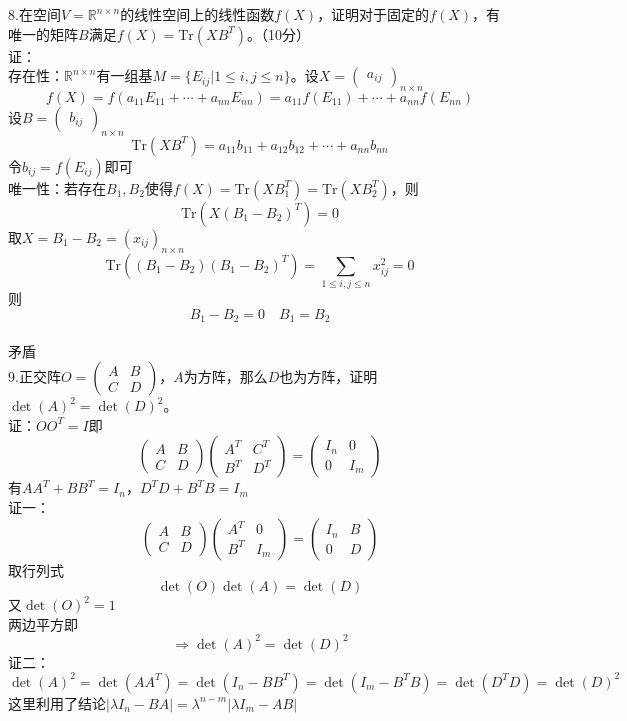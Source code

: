 \documentclass[UTF8]{ctexart}
\begin{document}
\noindent 8.在空间$V = \mathbb{R}^{n \times n}$的线性空间上的线性函数$f(X)$，证明对于固定的$f(X)$，有唯一的矩阵$B$满足$f(X) = \mathrm{Tr}(XB^T)$。（10分）\\
证：\\
存在性：$\mathbb{R}^{n \times n}$有一组基$M = \{ E_{ij} | 1 \leq i, j \leq n \}$。设$X = \begin{pmatrix} a_{ij} \end{pmatrix}_{n \times n}$
			\[
			f(X) = f(a_{11}E_{11} + \cdots + a_{nn}E_{nn}) = a_{11}f(E_{11}) + \cdots + a_{nn}f(E_{nn})
			\]
			设$B = \begin{pmatrix} b_{ij} \end{pmatrix}_{n \times n}$
			\[
			\text{Tr}(XB^T) = a_{11}b_{11} + a_{12}b_{12} + \cdots + a_{nn}b_{nn}
			\]
			令$b_{ij} = f(E_{ij})$即可\\
唯一性：若存在$B_1, B_2$使得$f(X) = \text{Tr}(XB_1^T) = \text{Tr}(XB_2^T)$，则
			\[
			\text{Tr}(X(B_1 - B_2)^T) = 0
			\]
			取$X = B_1 - B_2 = (x_{ij})_{n \times n}$
			\[
			\text{Tr}((B_1 - B_2)(B_1 - B_2)^T) = \sum_{1 \leq i,j \leq n} x_{ij}^2 = 0
			\]
则
			\[
			B_1 - B_2 = 0\quad  B_1 = B_2
			\]\\
矛盾\\


		
\noindent 9.正交阵$O = \begin{pmatrix} A & B \\ C & D \end{pmatrix}$，$A$为方阵，那么$D$也为方阵，证明$\det(A)^2 = \det(D)^2$。\\
证：$OO^T = I$即
$$\begin{pmatrix} A & B \\ C & D \end{pmatrix} \begin{pmatrix} A^T & C^T \\ B^T & D^T \end{pmatrix} = \begin{pmatrix} I_n & 0 \\ 0 & I_m \end{pmatrix}$$
有$AA^T + BB^T = I_n$，$D^TD + B^TB = I_m$\\
证一：
		\[
		\begin{pmatrix} A & B \\ C & D \end{pmatrix} \begin{pmatrix} A^T & 0 \\ B^T & I_m \end{pmatrix} = \begin{pmatrix} I_n & B \\ 0 & D \end{pmatrix}
		\]
		取行列式
		$$\det(O)\det(A) = \det(D)$$
		又$\det(O)^2 = 1$\\
		两边平方即
		$$\Rightarrow \det(A)^2 = \det(D)^2$$
证二：
		\[
		\det(A)^2 = \det(AA^T) = \det(I_n - BB^T) = \det(I_m - B^TB) = \det(D^TD) = \det(D)^2
		\]
		这里利用了结论$|\lambda I_n - BA| = \lambda^{n-m}|\lambda I_m - AB|$

	
\end{document}
